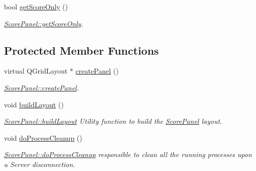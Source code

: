 \begin{DoxyCompactItemize}
bool \mbox{\hyperlink{classScorePanel_a2c2bba4095fa6ac83cb96913cc7dfd9f}{get\+Score\+Only}} ()
\begin{DoxyCompactList}\small\item\em \mbox{\hyperlink{classScorePanel_a2c2bba4095fa6ac83cb96913cc7dfd9f}{Score\+Panel\+::get\+Score\+Only}}. \end{DoxyCompactList}\end{DoxyCompactItemize}
\subsection*{Protected Member Functions}
\begin{DoxyCompactItemize}
\item 
virtual Q\+Grid\+Layout $\ast$ \mbox{\hyperlink{classScorePanel_aae4f1b7b8ee1afc61ac53105f8657fdb}{create\+Panel}} ()
\begin{DoxyCompactList}\small\item\em \mbox{\hyperlink{classScorePanel_aae4f1b7b8ee1afc61ac53105f8657fdb}{Score\+Panel\+::create\+Panel}}. \end{DoxyCompactList}\item 
\mbox{\label{classScorePanel_aec69374bc8b6c5b7db92f59b6f56b097}} 
void \mbox{\hyperlink{classScorePanel_aec69374bc8b6c5b7db92f59b6f56b097}{build\+Layout}} ()
\begin{DoxyCompactList}\small\item\em \mbox{\hyperlink{classScorePanel_aec69374bc8b6c5b7db92f59b6f56b097}{Score\+Panel\+::build\+Layout}} Utility function to build the \mbox{\hyperlink{classScorePanel}{Score\+Panel}} layout. \end{DoxyCompactList}\item 
\mbox{\label{classScorePanel_abffeac6985e3e7246b41f8ef7ee2fe45}} 
void \mbox{\hyperlink{classScorePanel_abffeac6985e3e7246b41f8ef7ee2fe45}{do\+Process\+Cleanup}} ()
\begin{DoxyCompactList}\small\item\em \mbox{\hyperlink{classScorePanel_abffeac6985e3e7246b41f8ef7ee2fe45}{Score\+Panel\+::do\+Process\+Cleanup}} responsible to clean all the running processes upon a Server disconnection. \end{DoxyCompactList}\end{DoxyCompactItemize}
